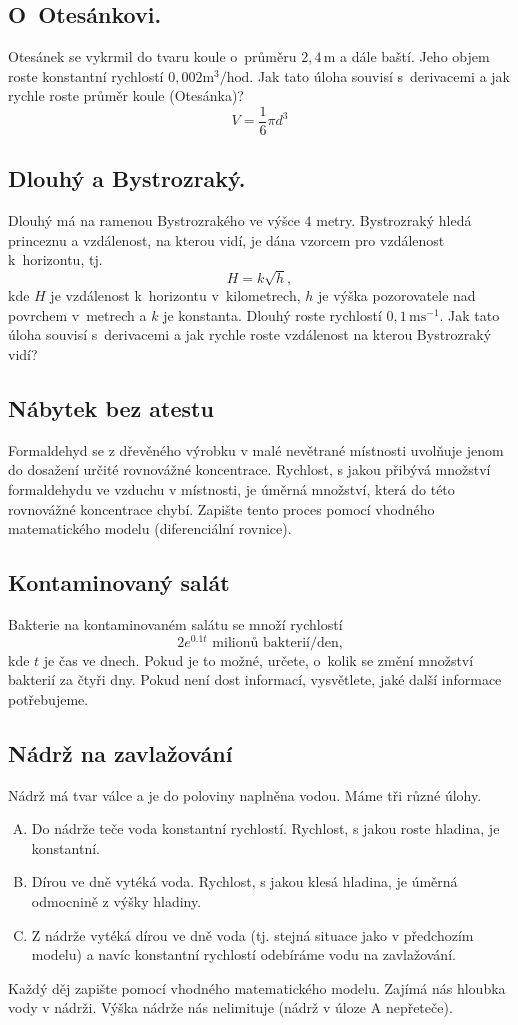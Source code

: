 \subsection{O Otesánkovi.}
Otesánek se vykrmil do tvaru koule o průměru $2{,}4\,\mathrm{m}$ a dále baští. Jeho objem roste konstantní rychlostí $0{,}002 \mathrm{m}^3/\mathrm{hod}$. Jak tato úloha souvisí s derivacemi a jak rychle roste průměr koule (Otesánka)? $$V=\frac 16 \pi d^3$$

\subsection{Dlouhý a Bystrozraký.} Dlouhý má na ramenou Bystrozrakého ve výšce $4$ metry. Bystrozraký hledá princeznu a vzdálenost, na kterou vidí, je dána vzorcem pro vzdálenost k horizontu, tj. $$H=k\sqrt {h},$$ kde $H$ je vzdálenost k horizontu v kilometrech, $h$ je výška pozorovatele nad povrchem  v metrech  a $k$ je konstanta.
  Dlouhý roste rychlostí $0{,}1\,\mathrm{m} \mathrm{s}^{-1}$.
Jak tato úloha souvisí s derivacemi a jak rychle roste vzdálenost na kterou Bystrozraký vidí?

\subsection{Nábytek bez atestu}

Formaldehyd se z dřevěného výrobku v malé nevětrané místnosti uvolňuje jenom do dosažení určité rovnovážné koncentrace. Rychlost, s jakou přibývá množství formaldehydu ve vzduchu v místnosti, je úměrná množství, která do této rovnovážné koncentrace chybí. Zapište tento proces pomocí vhodného matematického modelu (diferenciální rovnice).

\subsection{Kontaminovaný salát} Bakterie na kontaminovaném salátu se množí rychlostí  $$2e^{0.1t}\text{ milionů bakterií/den,}$$  kde $t$ je čas ve dnech. Pokud je to možné, určete, o~kolik se změní množství bakterií za čtyři dny. Pokud není dost informací, vysvětlete, jaké další informace potřebujeme.


\subsection{Nádrž na zavlažování}

Nádrž má tvar válce a je do poloviny naplněna vodou. Máme tři různé úlohy.
\begin{enumerate}[(A)] pt
\item Do nádrže teče voda konstantní rychlostí. Rychlost, s jakou roste hladina, je konstantní.
\item Dírou ve dně vytéká voda. Rychlost, s jakou klesá hladina, je úměrná odmocnině z výšky hladiny.
\item Z nádrže vytéká dírou ve dně voda (tj. stejná situace jako v předchozím modelu) a navíc konstantní rychlostí odebíráme vodu na zavlažování.
\end{enumerate}
Každý děj zapište pomocí
vhodného matematického modelu. Zajímá nás
hloubka vody v nádrži. Výška nádrže nás
nelimituje (nádrž v úloze A nepřeteče).


